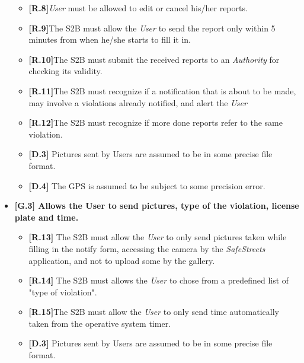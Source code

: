 \begin{itemize}
\begin{itemize}
        \item \textbf{[R.8]}\textit{User} must be allowed to edit or cancel his/her reports. 
        
        \item \textbf{[R.9]}The S2B must allow the \textit{User} to send the report only within 5 minutes from when he/she starts to fill it in. 
        
        \item \textbf{[R.10]}The S2B must submit the received reports to an \textit{Authority} for checking its validity.
        
        \item \textbf{[R.11]}The S2B must recognize if a notification that is about to be made, may involve a violations already notified, and alert the \textit{User}
        
        \item \textbf{[R.12]}The S2B must recognize if more done reports refer to the same violation.
        
        \item \textbf{[D.3]} Pictures sent by Users are assumed to be in some precise file format.
        
        \item \textbf{[D.4]} The GPS is assumed to be subject to some precision error.
\end{itemize}

\item \textbf{{[G.3]} Allows the User to send pictures, type of the violation, license plate and time.}

\begin{itemize}
        \item \textbf{[R.13]} The S2B must allow the \textit{User} to only send pictures taken while filling in the notify form, accessing the camera by the \textit{SafeStreets} application, and not to upload some by the gallery.
        
        \item \textbf{[R.14]} The S2B must allows the \textit{User} to chose from a predefined list of "type of violation". 
        
        \item \textbf{[R.15]}The S2B must allow the \textit{User} to only send time automatically taken from the operative system timer.
        
        \item \textbf{[D.3]} Pictures sent by Users are assumed to be in some precise file format.
\end{itemize}



\end{itemize}
